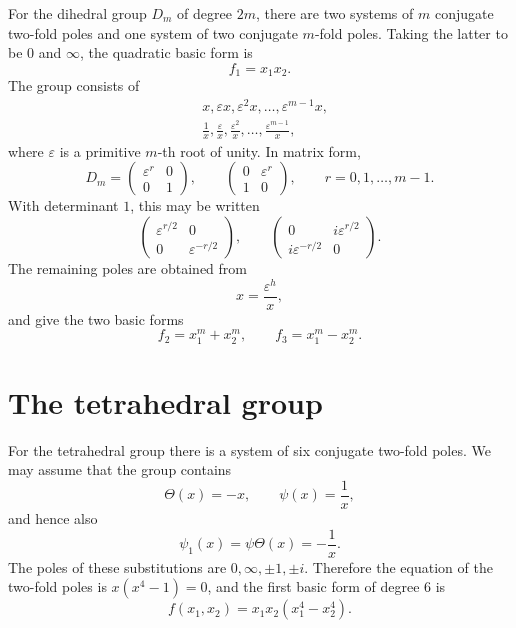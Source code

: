 \documentclass[11pt]{article}
\begin{document}
For the dihedral group $D_m$ of degree $2m$, there are two systems of $m$ conjugate two-fold poles and one system of two conjugate $m$-fold poles.  Taking the latter to be $0$ and $\infty$, the quadratic basic form is
\[
 f_1=x_1x_2.
\]
The group consists of
\begin{align*}
 &x,\varepsilon x,\varepsilon^2x,\ldots,\varepsilon^{m-1}x,\\
 &\frac1x,\frac{\varepsilon}{x},\frac{\varepsilon^2}{x},\ldots,\frac{\varepsilon^{m-1}}x,
\end{align*}
where $\varepsilon$ is a primitive $m$-th root of unity.  In matrix form,
\begin{equation}\label{eq:w9-Dm}
 D_m=
 \begin{pmatrix}\varepsilon^r&0\\0&1\end{pmatrix},
 \qquad
 \begin{pmatrix}0&\varepsilon^r\\1&0\end{pmatrix},
 \qquad r=0,1,\ldots,m-1.
\end{equation}
With determinant $1$, this may be written
\begin{equation}\label{eq:w9-Dm-det1}
 \begin{pmatrix}\varepsilon^{r/2}&0\\0&\varepsilon^{-r/2}\end{pmatrix},
 \qquad
 \begin{pmatrix}0&i\varepsilon^{r/2}\\ i\varepsilon^{-r/2}&0\end{pmatrix}.
\end{equation}
The remaining poles are obtained from
\[
 x=\frac{\varepsilon^h}{x},
\]
and give the two basic forms
\begin{equation}\label{eq:w9-dihedral-basic}
 f_2=x_1^m+x_2^m,
 \qquad
 f_3=x_1^m-x_2^m.
\end{equation}

\section{The tetrahedral group}

For the tetrahedral group there is a system of six conjugate two-fold poles.  We may assume that the group contains
\[
 \Theta(x)=-x,
 \qquad
 \psi(x)=\frac1x,
\]
and hence also
\[
 \psi_1(x)=\psi\Theta(x)=-\frac1x.
\]
The poles of these substitutions are $0,\infty,\pm1,\pm i$.  Therefore the equation of the two-fold poles is $x(x^4-1)=0$, and the first basic form of degree $6$ is
\begin{equation}\label{eq:w9-tet-f}
 f(x_1,x_2)=x_1x_2(x_1^4-x_2^4).
\end{equation}
\end{document}
